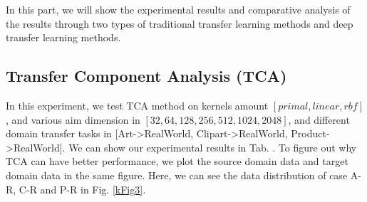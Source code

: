 \documentclass[conference]{IEEEtran}
\begin{document}
In this part, we will show the experimental results and comparative analysis of the results through two types of traditional transfer learning methods and deep transfer learning methods.


\subsection{Transfer Component Analysis (TCA)}

In this experiment, we test TCA method on kernels amount $[primal, linear, rbf]$, and various aim dimension in $[32,64,128,256,512,1024,2048]$, and different domain transfer tasks in [Art->RealWorld, Clipart->RealWorld, Product->RealWorld]. We can show our experimental results in Tab. . To figure out why TCA can have better performance, we plot the source domain data and target domain data in the same figure. Here, we can see the data distribution of case A-R, C-R and P-R in Fig. \ref{kFig3}.
\end{document}
